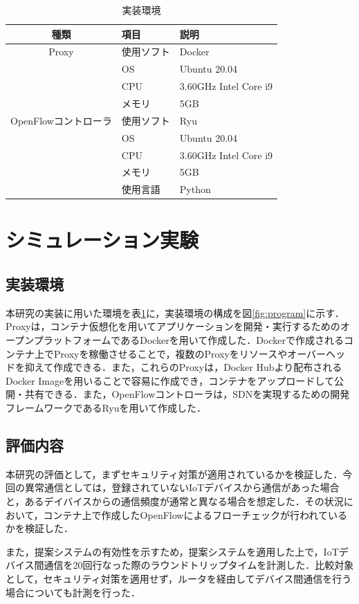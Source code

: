 \documentclass[Japanese]{dicomopapers}
\begin{document}
\begin{table}[!tb]
	\caption{実装環境}
	\label{tab:program}
	\centering
	\begin{tabular}{c|l|l}
		\hline
		種類                 & 項目       & 説明                  \\
		\hline \hline
		Proxy                & 使用ソフト & Docker                \\
		                     & OS         & Ubuntu 20.04          \\
		                     & CPU        & 3.60GHz Intel Core i9 \\
		                     & メモリ     & 5GB                   \\
		\hline
		OpenFlowコントローラ & 使用ソフト & Ryu                   \\
		                     & OS         & Ubuntu 20.04          \\
		                     & CPU        & 3.60GHz Intel Core i9 \\
		                     & メモリ     & 5GB                   \\
		                     & 使用言語   & Python                \\
		\hline
	\end{tabular}
\end{table}

\section{シミュレーション実験}
\subsection{実装環境}
本研究の実装に用いた環境を表\ref{tab:program}に，実装環境の構成を図\ref{fig:program}に示す．Proxyは，コンテナ仮想化を用いてアプリケーションを開発・実行するためのオープンプラットフォームであるDockerを用いて作成した．Dockerで作成されるコンテナ上でProxyを稼働させることで，複数のProxyをリソースやオーバーヘッドを抑えて作成できる．また，これらのProxyは，Docker Hubより配布されるDocker Imageを用いることで容易に作成でき，コンテナをアップロードして公開・共有できる．また，OpenFlowコントローラは，SDNを実現するための開発フレームワークであるRyuを用いて作成した．

\subsection{評価内容}
本研究の評価として，まずセキュリティ対策が適用されているかを検証した．今回の異常通信としては，登録されていないIoTデバイスから通信があった場合と，あるデイバイスからの通信頻度が通常と異なる場合を想定した．その状況において，コンテナ上で作成したOpenFlowによるフローチェックが行われているかを検証した．\par
また，提案システムの有効性を示すため，提案システムを適用した上で，IoTデバイス間通信を20回行なった際のラウンドトリップタイムを計測した．比較対象として，セキュリティ対策を適用せず，ルータを経由してデバイス間通信を行う場合についても計測を行った．
\end{document}
